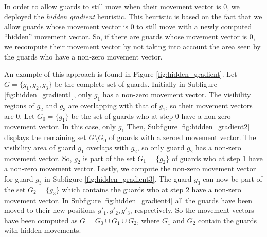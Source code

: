 In order to allow guards to still move when their movement vector is 0, we deployed the \textit{hidden gradient} heuristic. This heuristic is based on the fact that we allow guards whose movement vector is 0 to still move with a newly computed ``hidden'' movement vector. So, if there are guards whose movement vector is 0, we  recompute their movement vector by not taking into account the area seen by the guards who have a non-zero movement vector.

An example of this approach is found in Figure \ref{fig:hidden_gradient}. Let $G = \{g_1, g_2, g_3\}$ be the complete set of guards. Initially in Subfigure \ref{fig:hidden_gradient1}, only $g_1$ has a non-zero movement vector. The visibility regions of $g_2$ and $g_3$ are overlapping with that of $g_1$, so their movement vectors are 0. Let $G_0 = \{g_1\}$ be the set of guards who at step 0 have a non-zero movement vector. In this case, only $g_1$
Then, Subfigure \ref{fig:hidden_gradient2} displays the remaining set $G \setminus G_0$ of guards with a zeroed movement vector. The visibility area of guard $g_1$ overlaps with $g_2$, so only guard $g_2$ has a non-zero movement vector. So, $g_2$ is part of the set $G_1 = \{g_2\}$ of guards who at step 1 have a non-zero movement vector.
Lastly, we  compute the non-zero movement vector for guard $g_3$ in Subfigure \ref{fig:hidden_gradient3}. The guard $g_3$ can now be part of the set $G_2 = \{g_3\}$ which contains the guards who at step 2 have a non-zero movement vector.
In Subfigure \ref{fig:hidden_gradient4} all the guards have been moved to their new positions $g'_1, g'_2, g'_3$, respectively. So the movement vectors have been computed as $G = G_0 \cup G_1 \cup G_2$, where $G_1$ and $G_2$ contain the guards with hidden movements.

